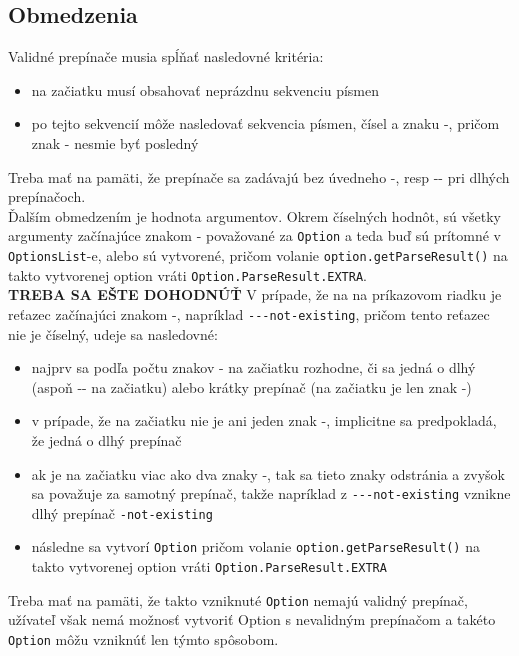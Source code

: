 \documentclass{article}
\begin{document}
\subsection{Obmedzenia}
\label{Obmedzenia}
Validné prepínače musia spĺňať nasledovné kritéria:
\begin{itemize}
	\item na začiatku musí obsahovať neprázdnu sekvenciu písmen
	\item po tejto sekvencií môže nasledovať sekvencia písmen, čísel a znaku -, pričom znak - nesmie byť posledný
\end{itemize}
Treba mať na pamäti, že prepínače sa zadávajú bez úvedneho -, resp -{}- pri dlhých prepínačoch.\\
Ďalším obmedzením je hodnota argumentov. Okrem číselných hodnôt, sú všetky argumenty začínajúce znakom - považované za \texttt{Option} a teda buď sú prítomné v \texttt{OptionsList}-e, alebo sú vytvorené, pričom volanie \texttt{option.getParseResult()} na takto vytvorenej option vráti \texttt{Option.ParseResult.EXTRA}.\\
\textbf{TREBA SA EŠTE DOHODNÚŤ} V prípade, že na na príkazovom riadku je reťazec začínajúci znakom -, napríklad \texttt{-{}-{}-{}not-existing}, pričom tento reťazec nie je číselný, udeje sa nasledovné:
\begin{itemize}
	\item najprv sa podľa počtu znakov - na začiatku rozhodne, či sa jedná o dlhý (aspoň -{}- na začiatku) alebo krátky prepínač (na začiatku je len znak -)
	\item v prípade, že na začiatku nie je ani jeden znak -, implicitne sa predpokladá, že jedná o dlhý prepínač
	\item ak je na začiatku viac ako dva znaky -, tak sa tieto znaky odstránia a zvyšok sa považuje za samotný prepínač, takže napríklad z \texttt{-{}-{}-{}not-existing} vznikne dlhý prepínač \texttt{-not-existing}
	\item následne sa vytvorí \texttt{Option} pričom volanie \texttt{option.getParseResult()} na takto vytvorenej option vráti \texttt{Option.ParseResult.EXTRA}
\end{itemize}
Treba mať na pamäti, že takto vzniknuté \texttt{Option} nemajú validný prepínač, užívateľ však nemá možnosť vytvoriť Option s nevalidným prepínačom a takéto \texttt{Option} môžu vzniknúť len týmto spôsobom.
\end{document}
